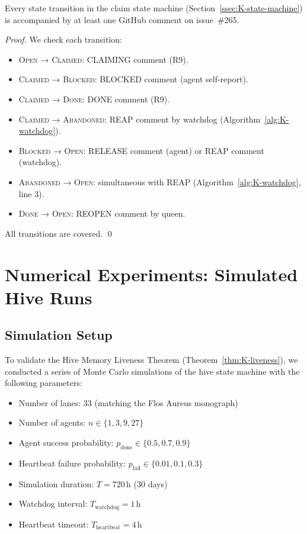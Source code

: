 \begin{lemma}
\label{lem:K-completeness}
Every state transition in the claim state machine
(Section~\ref{ssec:K-state-machine}) is accompanied by at least one
GitHub comment on issue~\#265.
\end{lemma}
\begin{proof}
We check each transition:
\begin{itemize}
  \item \textsc{Open} → \textsc{Claimed}: CLAIMING comment (R9).
  \item \textsc{Claimed} → \textsc{Blocked}: BLOCKED comment (agent self-report).
  \item \textsc{Claimed} → \textsc{Done}: DONE comment (R9).
  \item \textsc{Claimed} → \textsc{Abandoned}: REAP comment by watchdog
    (Algorithm~\ref{alg:K-watchdog}).
  \item \textsc{Blocked} → \textsc{Open}: RELEASE comment (agent) or
    REAP comment (watchdog).
  \item \textsc{Abandoned} → \textsc{Open}: simultaneous with REAP
    (Algorithm~\ref{alg:K-watchdog}, line 3).
  \item \textsc{Done} → \textsc{Open}: REOPEN comment by queen.
\end{itemize}
All transitions are covered.
\qed
\end{proof}


\section{Numerical Experiments: Simulated Hive Runs}
\label{sec:K-experiments}

\subsection{Simulation Setup}
\label{ssec:K-sim-setup}

To validate the Hive Memory Liveness Theorem
(Theorem~\ref{thm:K-liveness}), we conducted a series of Monte Carlo
simulations of the hive state machine with the following parameters:
\begin{itemize}
  \item Number of lanes: 33 (matching the Flos Aureus monograph)
  \item Number of agents: $n \in \{1, 3, 9, 27\}$
  \item Agent success probability: $p_{\text{done}} \in \{0.5, 0.7, 0.9\}$
  \item Heartbeat failure probability: $p_{\text{fail}} \in \{0.01, 0.1, 0.3\}$
  \item Simulation duration: $T = 720\,\text{h}$ (30 days)
  \item Watchdog interval: $T_{\text{watchdog}} = 1\,\text{h}$
  \item Heartbeat timeout: $T_{\text{heartbeat}} = 4\,\text{h}$
\end{itemize}

